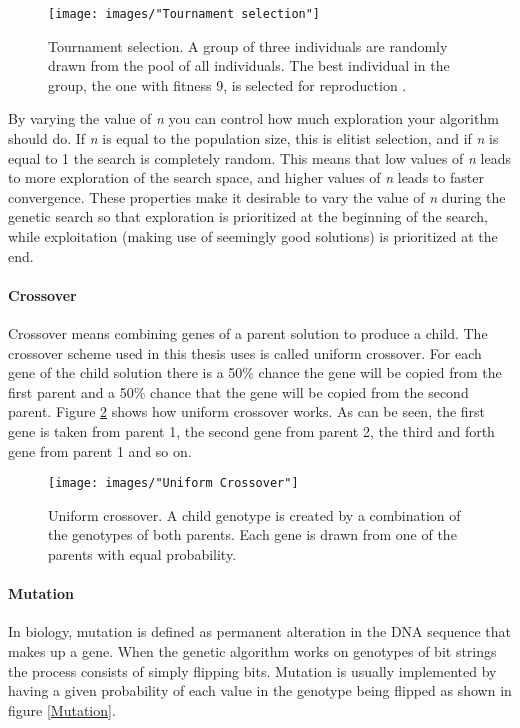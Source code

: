 \begin{figure}[h!]
\begin{center}
\texttt{[image: images/"Tournament selection"]}
\caption{Tournament selection. A group of three individuals are randomly drawn from the pool of all individuals. The best individual  in the group, the one with fitness 9, is selected for reproduction \citep{Razali}.}
\label{Tournament selection}
\end{center}
\end{figure}


\noindent By varying the value of \textit{n} you can control how much exploration your algorithm should do. If \textit{n} is equal to the population size, this is elitist selection, and if \textit{n} is equal to 1 the search is completely random. This means that low values of \textit{n} leads to more exploration of the search space, and higher values of \textit{n} leads to faster convergence. These properties make it desirable to vary the value of \textit{n} during the genetic search so that exploration is prioritized at the beginning of the search, while exploitation (making use of seemingly good solutions) is prioritized at the end.\\


\paragraph*{Crossover}
Crossover means combining genes of a parent solution to produce a child. The crossover scheme used in this thesis uses is called uniform crossover. For each gene of the child solution there is a 50\% chance the gene will be copied from the first parent and a 50\% chance that the gene will be copied from the second parent. Figure \ref{Uniform Crossover} shows how uniform crossover works. As can be seen, the first gene is taken from parent 1, the second gene from parent 2, the third and forth gene from parent 1 and so on. 


\begin{figure}[h!]
\begin{center}
\texttt{[image: images/"Uniform Crossover"]}
\caption{Uniform crossover. A child genotype is created by a combination of the genotypes of both parents. Each gene is drawn from one of the parents with equal probability.}
\label{Uniform Crossover}
\end{center}
\end{figure}


\paragraph*{Mutation}
In biology, mutation is defined as permanent alteration in the DNA sequence that makes up a gene. When the genetic algorithm works on genotypes of bit strings the process consists of simply flipping bits. Mutation is usually implemented by having a given probability of each value in the genotype being flipped as shown in figure \ref{Mutation}.\\


